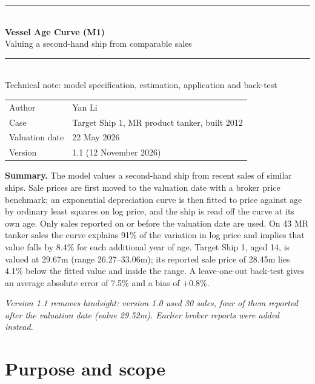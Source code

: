 \documentclass[11pt,a4paper]{article}
\newcommand{\usd}[1]{\text{US\$}#1}
\begin{document}
\begin{titlepage}
\vspace*{3cm}
{\color{accent}\rule{\linewidth}{1pt}}\\[0.8em]
{\LARGE\bfseries Vessel Age Curve (M1)}\\[0.4em]
{\Large Valuing a second-hand ship from comparable sales}\\[0.6em]
{\color{accent}\rule{\linewidth}{1pt}}\\[1.5em]
{\large Technical note: model specification, estimation, application and back-test}\\[3em]

\begin{tabular}{@{}ll@{}}
Author & Yan Li \\
Case & Target Ship 1, MR product tanker, built 2012 \\
Valuation date & 22 May 2026 \\
Version & 1.1 (12 November 2026) \\
\end{tabular}

\vfill
\begin{minipage}{\linewidth}
\small
\textbf{Summary.}
The model values a second-hand ship from recent sales of similar ships. Sale prices are first moved to the valuation date with a broker price benchmark; an exponential depreciation curve is then fitted to price against age by ordinary least squares on log price, and the ship is read off the curve at its own age.
Only sales reported on or before the valuation date are used. On 43 MR tanker sales the curve explains 91\% of the variation in log price and implies that value falls by 8.4\% for each additional year of age.
Target Ship 1, aged 14, is valued at \usd{29.67}m (range \usd{26.27}--33.06m); its reported sale price of \usd{28.45}m lies 4.1\% below the fitted value and inside the range.
A leave-one-out back-test gives an average absolute error of 7.5\% and a bias of $+0.8\%$.

\textit{Version 1.1 removes hindsight: version 1.0 used 30 sales, four of them reported after the valuation date (value \usd{29.52}m). Earlier broker reports were added instead.}
\end{minipage}
\end{titlepage}

\tableofcontents
\newpage

\section{Purpose and scope}
\end{document}
